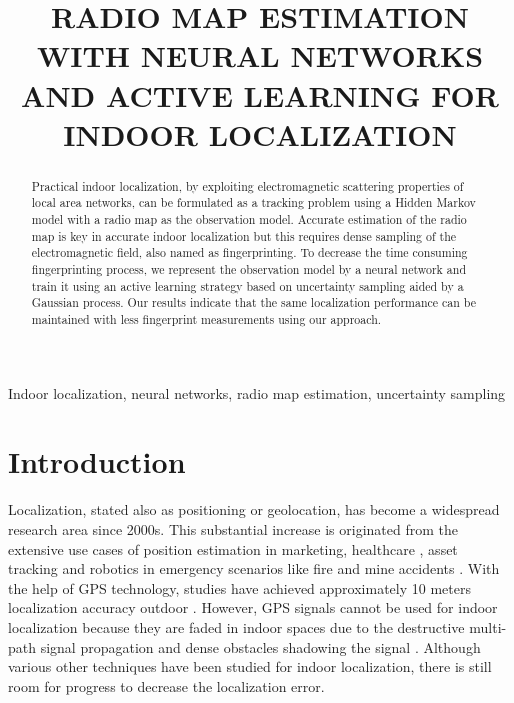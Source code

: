 \documentclass{article}
\title{RADIO MAP ESTIMATION WITH NEURAL NETWORKS AND ACTIVE LEARNING FOR INDOOR LOCALIZATION}
\begin{document}
	\maketitle
	\begin{abstract}
		Practical indoor localization, by exploiting electromagnetic scattering properties of local area networks, can be formulated as a tracking problem using a Hidden Markov model with a radio map as the observation model. Accurate estimation of the radio map is key in accurate indoor localization but this requires dense sampling 
		of the electromagnetic field, also named as fingerprinting. To decrease the time consuming fingerprinting 
		process, we represent the observation model by a neural network and train it using an active learning strategy based on uncertainty sampling aided by a Gaussian process. Our results indicate that the same localization performance can be maintained with less fingerprint measurements using our approach.
	\end{abstract}
	\begin{keywords}
		Indoor localization, neural networks, radio map estimation, uncertainty sampling
	\end{keywords}
	\section{Introduction}
	\label{sec:intro}
	
	Localization, stated also as positioning or geolocation, has become a widespread research area since 2000s. This substantial increase is originated from the extensive use cases of position estimation in marketing, healthcare \cite{Cal2015}, asset tracking and robotics in emergency scenarios like fire and mine accidents \cite{Zha2009}. With the help of GPS technology, studies have achieved approximately 10 meters localization accuracy outdoor \cite{Dju2001}. However, GPS signals cannot be used for indoor localization because they are faded in indoor spaces due to the destructive multi-path signal propagation and dense obstacles shadowing the signal \cite{bah2000,Bat2002}. Although various other techniques have been studied for indoor localization, there is still room for progress to decrease the localization error. 
	
\end{document}
